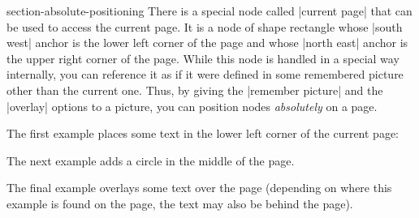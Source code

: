 \begin{BlockClass}{section-absolute-positioning}
There is a special node called |current page| that can be used to access the
current page. It is a node of shape rectangle whose |south west| anchor is the
lower left corner of the page and whose |north east| anchor is the upper right
corner of the page. While this node is handled in a special way internally, you
can reference it as if it were defined in some remembered picture other than
the current one. Thus, by giving the |remember picture| and the |overlay|
options to a picture, you can position nodes \emph{absolutely} on a page.

The first example places some text in the lower left corner of the current
page:
%
\begin{codeexample}[pre={\begin{BlockClass}{example-absolute-positioning-bottom-left}},post={\end{BlockClass}}]
\end{codeexample}

The next example adds a circle in the middle of the page.
%
\begin{codeexample}[pre={\begin{BlockClass}{example-absolute-positioning-center}},post={\end{BlockClass}}]
\end{codeexample}

The final example overlays some text over the page (depending on where this
example is found on the page, the text may also be behind the page).
%
\begin{codeexample}[pre={\begin{BlockClass}{example-absolute-positioning-center}},post={\end{BlockClass}}]
\end{codeexample}
\end{BlockClass}

